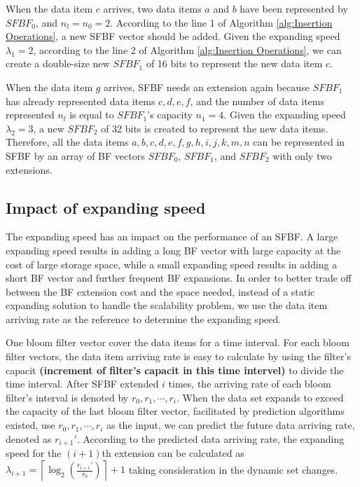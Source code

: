 \documentclass[10pt,journal,compsoc]{IEEEtran}
\newcommand{\note}[1]{{\sffamily\itshape\bfseries\uline{#1}}}
\begin{document}
When the data item $c$ arrives, two data items $a$ and $b$ have been represented by $SFBF_0$, and $n_l=n_0=2$. According to the line 1 of Algorithm \ref{alg:Insertion Operations}, a new SFBF vector should be added. Given the expanding speed ${\lambda _1} = 2$, according to the line 2 of Algorithm \ref{alg:Insertion Operations}, we can create a double-size new $SFBF_1$ of 16 bits to represent the new data item $c$.

When the data item $g$ arrives, SFBF needs an extension again because $SFBF_1$ has already represented data items $c, d, e, f$, and the number of data items represented $n_l$ is equal to $SFBF_1$'s capacity $n_1=4$.
Given the expanding speed ${\lambda _2} = 3$,  a new $SFBF_2$ of 32 bits is created to represent the new data items. Therefore, all the data items $a, b, c, d, e, f, g, h, i, j, k, m, n$ can be represented in SFBF by an array of BF vectors $SFBF_0$, $SFBF_1$, and $SFBF_2$ with only two extensions.

\subsection{Impact of expanding speed}
\label{sub:Impact of expanding speed}
The expanding speed has an impact on the performance of an SFBF. A large expanding speed results in adding a long BF vector with large capacity at the cost of large storage space, while a small expanding speed results in adding a short BF vector and further frequent BF expansions. In order to better trade off between the BF extension cost and the space needed, instead of a static expanding solution to handle the scalability problem, we use the data item arriving rate as the reference to determine the expanding speed.

One bloom filter vector cover the data items for a time interval. For each bloom filter vectors, the data item arriving rate is easy to calculate by using the filter's capacit \textbf{(increment of filter's capacit in this time intervel)} to divide the time interval. After SFBF extended $i$ times, the arriving rate of each bloom filter’s interval is denoted by $r_0,r_1,\cdots, r_i$. When the data set expands to exceed the capacity of the last bloom filter vector, facilitated by prediction algorithms existed, use $r_0,r_1,\cdots, r_i$ as the input, we can predict the future data arriving rate, denoted as ${r_{i + 1}'}$. According to the predicted data arriving rate,   the expanding speed for the $(i+1)$th extension can be calculated as ${\lambda _{i + 1}} = \left\lceil {{{\log }_2}\left( {\frac{{r_{i + 1}'}}{{{r_0}}}} \right)} \right\rceil +1$ taking consideration in the dynamic set changes.
\end{document}
